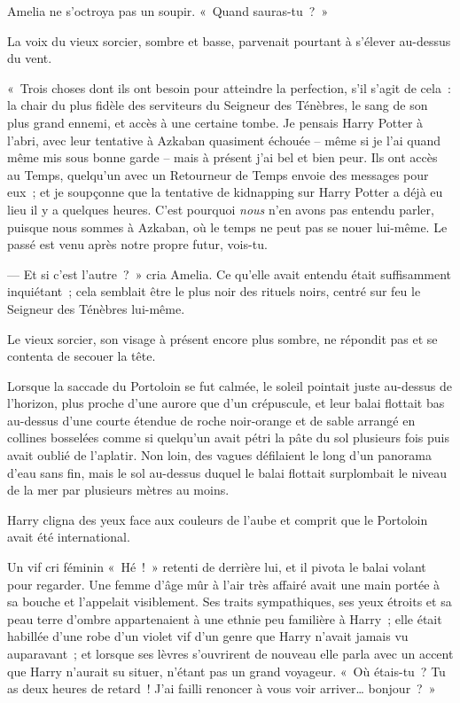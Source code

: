 Amelia ne s'octroya pas un soupir. «~Quand sauras-tu~?~»

La voix du vieux sorcier, sombre et basse, parvenait pourtant à s'élever au-dessus du vent.

«~Trois choses dont ils ont besoin pour atteindre la perfection, s'il s'agit de cela~: la chair du plus fidèle des serviteurs du Seigneur des Ténèbres, le sang de son plus grand ennemi, et accès à une certaine tombe. Je pensais Harry Potter à l'abri, avec leur tentative à Azkaban quasiment échouée -- même si je l'ai quand même mis sous bonne garde -- mais à présent j'ai bel et bien peur. Ils ont accès au Temps, quelqu'un avec un Retourneur de Temps envoie des messages pour eux~; et je soupçonne que la tentative de kidnapping sur Harry Potter a déjà eu lieu il y a quelques heures. C'est pourquoi \emph{nous} n'en avons pas entendu parler, puisque nous sommes à Azkaban, où le temps ne peut pas se nouer lui-même. Le passé est venu après notre propre futur, vois-tu.

--- Et si c'est l'autre~?~» cria Amelia. Ce qu'elle avait entendu était suffisamment inquiétant~; cela semblait être le plus noir des rituels noirs, centré sur feu le Seigneur des Ténèbres lui-même.

Le vieux sorcier, son visage à présent encore plus sombre, ne répondit pas et se contenta de secouer la tête.

\later

Lorsque la saccade du Portoloin se fut calmée, le soleil pointait juste au-dessus de l'horizon, plus proche d'une aurore que d'un crépuscule, et leur balai flottait bas au-dessus d'une courte étendue de roche noir-orange et de sable arrangé en collines bosselées comme si quelqu'un avait pétri la pâte du sol plusieurs fois puis avait oublié de l'aplatir. Non loin, des vagues défilaient le long d'un panorama d'eau sans fin, mais le sol au-dessus duquel le balai flottait surplombait le niveau de la mer par plusieurs mètres au moins.

Harry cligna des yeux face aux couleurs de l'aube et comprit que le Portoloin avait été international.

Un vif cri féminin «~Hé~!~» retenti de derrière lui, et il pivota le balai volant pour regarder. Une femme d'âge mûr à l'air très affairé avait une main portée à sa bouche et l'appelait visiblement. Ses traits sympathiques, ses yeux étroits et sa peau terre d'ombre appartenaient à une ethnie peu familière à Harry~; elle était habillée d'une robe d'un violet vif d'un genre que Harry n'avait jamais vu auparavant~; et lorsque ses lèvres s'ouvrirent de nouveau elle parla avec un accent que Harry n'aurait su situer, n'étant pas un grand voyageur. «~Où étais-tu~? Tu as deux heures de retard~! J'ai failli renoncer à vous voir arriver… bonjour~?~»

